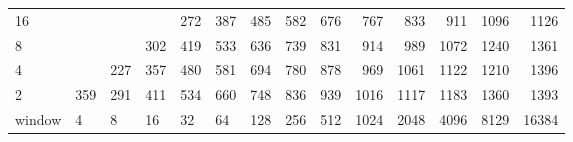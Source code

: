 \begin{table}[h]
{\begin{tabular}{lrrrrrrrrrrrrr}
			\multicolumn{1}{|l|}{16} &  &  &  & \cellcolor[HTML]{99E600}272 & \cellcolor[HTML]{99E600}387 & \cellcolor[HTML]{E69900}485 & \cellcolor[HTML]{E69900}582 & \cellcolor[HTML]{E60000}676 & \cellcolor[HTML]{E60000}767 & \cellcolor[HTML]{E60000}833 & \cellcolor[HTML]{9900E6}911 & \cellcolor[HTML]{9900E6}1096 & \cellcolor[HTML]{9900E6}1126 \\ \cline{1-1}
			\multicolumn{1}{|l|}{8} &  &  & \cellcolor[HTML]{99E600}302 & \cellcolor[HTML]{E69900}419 & \cellcolor[HTML]{E69900}533 & \cellcolor[HTML]{E69900}636 & \cellcolor[HTML]{E60000}739 & \cellcolor[HTML]{E60000}831 & \cellcolor[HTML]{9900E6}914 & \cellcolor[HTML]{9900E6}989 & \cellcolor[HTML]{9900E6}1072 & \cellcolor[HTML]{4C00E6}1240 & \cellcolor[HTML]{4C00E6}1361 \\ \cline{1-1}
			\multicolumn{1}{|l|}{4} &  & \cellcolor[HTML]{99E600}227 & \cellcolor[HTML]{99E600}357 & \cellcolor[HTML]{E69900}480 & \cellcolor[HTML]{E69900}581 & \cellcolor[HTML]{E60000}694 & \cellcolor[HTML]{E60000}780 & \cellcolor[HTML]{E60000}878 & \cellcolor[HTML]{9900E6}969 & \cellcolor[HTML]{9900E6}1061 & \cellcolor[HTML]{9900E6}1122 & \cellcolor[HTML]{4C00E6}1210 & \cellcolor[HTML]{4C00E6}1396 \\ \cline{1-1}
			\multicolumn{1}{|l|}{2} & \cellcolor[HTML]{99E600}359 & \cellcolor[HTML]{99E600}291 & \cellcolor[HTML]{99E600}411 & \cellcolor[HTML]{E69900}534 & \cellcolor[HTML]{E69900}660 & \cellcolor[HTML]{E60000}748 & \cellcolor[HTML]{E60000}836 & \cellcolor[HTML]{9900E6}939 & \cellcolor[HTML]{9900E6}1016 & \cellcolor[HTML]{9900E6}1117 & \cellcolor[HTML]{4C00E6}1183 & \cellcolor[HTML]{4C00E6}1360 & \cellcolor[HTML]{4C00E6}1393 \\ \cline{1-1} \cline{11-14} 
			\multicolumn{1}{l|}{window} & \multicolumn{1}{l|}{4} & \multicolumn{1}{l|}{8} & \multicolumn{1}{l|}{16} & \multicolumn{1}{l|}{32} & \multicolumn{1}{l|}{64} & \multicolumn{1}{l|}{128} & \multicolumn{1}{l|}{256} & \multicolumn{1}{l|}{512} & \multicolumn{1}{l|}{1024} & \multicolumn{1}{l|}{2048} & \multicolumn{1}{l|}{4096} & \multicolumn{1}{l|}{8129} & \multicolumn{1}{l|}{16384} \\ \cline{2-14} 
		\end{tabular}
	}
\end{table}


